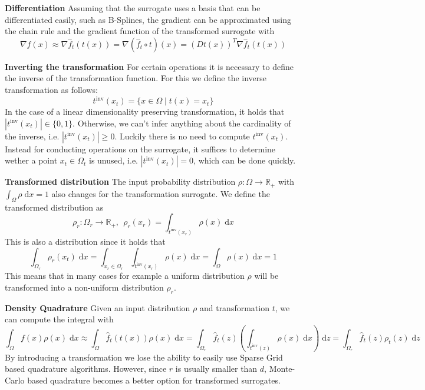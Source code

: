\documentclass[
  a4paper,  %
  twoside,  %
  bibliography=totoc,
  headsepline,
  cleardoublepage=empty,
  parskip=half,
  draft=false
]{scrbook}
\begin{document}
\textbf{Differentiation }
Assuming that the surrogate uses a basis that can be differentiated easily, such as B-Splines, the gradient can be approximated using the chain rule and the gradient function of the transformed surrogate with
\begin{equation}
\nabla f(x) \approx \nabla \hat{f}_t(t(x)) = \nabla (\hat{f}_t \circ t)(x)=(Dt(x))^T \nabla \hat{f}_t(t(x))
\end{equation}

\vspace{1em}
\textbf{Inverting the transformation  }
For certain operations it is necessary to define the inverse of the transformation function.
For this we define the inverse transformation as follows:
\begin{equation}
t^{\text{inv}}(x_{t})=\{x \in \Omega \mid t(x)=x_{t}\}
\end{equation}
In the case of a linear dimensionality preserving transformation, it holds that $|t^{\text{inv}}(x_{t})| \in \{0,1\}$.
Otherwise, we can't infer anything about the cardinality of the inverse, i.e. $|t^{\text{inv}}(x_{t})| \geq 0$.
Luckily there is no need to compute $t^{\text{inv}}(x_{t})$. Instead for conducting operations on the surrogate, it suffices to determine wether a point $x_t \in \Omega_t$ is unused, i.e. $|t^{\text{inv}}(x_{t})| = 0$, which can be done quickly.

\vspace{1em}
\textbf{Transformed distribution}
The input probability distribution $\rho \colon \Omega \to \mathds{R_+}$ with $\int_{\Omega} \rho \; \text{d}x = 1$ also changes for the transformation surrogate.
We define the transformed distribution as
\begin{equation}
\rho_r \colon \Omega_r \to \mathds{R_+}, ~~ \rho_r(x_r)=\int_{t^{\text{inv}}(x_r)} \rho(x) \; \text{d}x 
\end{equation}
This is also a distribution since it holds that
\begin{equation}
\int_{\Omega_r} \rho_r(x_t) \; \text{d}x=\int_{x_r \in \Omega_r} \int_{t^{\text{inv}}(x_r)} \rho(x) \; \text{d}x = \int_{\Omega} \rho(x) \; \text{d}x = 1
\end{equation}
This means that in many cases for example a uniform distribution $\rho$ will be transformed into a non-uniform distribution $\rho_r$.

\vspace{1em}
\textbf{Density Quadrature}
Given an input distribution $\rho$ and transformation $t$, we can compute the integral with
\begin{equation}
\int_{\Omega} f(x) \rho(x) \; \text{d}x \approx \int_{\Omega} \hat{f}_t(t(x)) \rho(x) \; \text{d}x
=
\int_{\Omega_r} \hat{f}_t(z) \left(\int_{t^{\text{inv}}(z)} \rho(x)  \; \text{d}x \right)  \; \text{d}z=
\int_{\Omega_r} \hat{f}_t(z) \rho_t(z) \; \text{d}z
\end{equation}
By introducing a transformation we lose the ability to easily use Sparse Grid based quadrature algorithms.
However, since $r$ is usually smaller than $d$, Monte-Carlo based quadrature becomes a better option for transformed surrogates.
\end{document}
